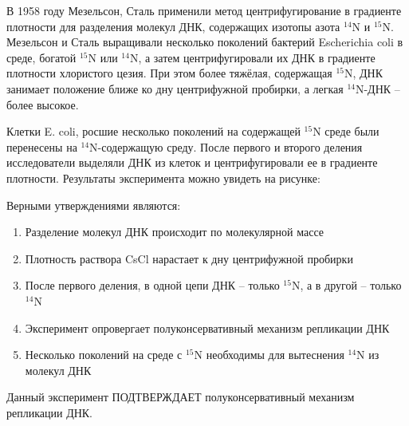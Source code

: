 
В 1958 году Мезельсон, Сталь применили метод
центрифугирование в градиенте плотности для разделения молекул ДНК, содержащих
изотопы азота $^{14}$N и $^{15}$N. Мезельсон и Сталь выращивали
несколько поколений бактерий Escherichia
coli в среде, богатой $^{15}$N или $^{14}$N, а затем
центрифугировали их ДНК в градиенте плотности хлористого цезия. При этом более
тяжёлая, содержащая $^{15}$N, ДНК занимает положение ближе ко дну
центрифужной пробирки, а легкая $^{14}$N-ДНК – более высокое. 

Клетки E. coli,
росшие несколько поколений на содержащей $^{15}$N среде были перенесены
на $^{14}$N-содержащую среду. После первого и второго деления
исследователи выделяли ДНК из клеток и центрифугировали ее в градиенте плотности.
Результаты эксперимента можно увидеть на рисунке:


Верными утверждениями являются:

\begin{enumerate}
    \item Разделение молекул ДНК происходит по молекулярной массе
    \item Плотность раствора CsCl нарастает к дну центрифужной пробирки
    \item После первого деления, в одной цепи ДНК – только $^{15}$N, а в другой – только $^{14}$N
    \item Эксперимент опровергает полуконсервативный механизм репликации ДНК
    \item Несколько поколений на среде с $^{15}$N необходимы для вытеснения $^{14}$N из молекул ДНК
\end{enumerate}

\explanationSection

Данный эксперимент ПОДТВЕРЖДАЕТ полуконсервативный механизм репликации ДНК.

